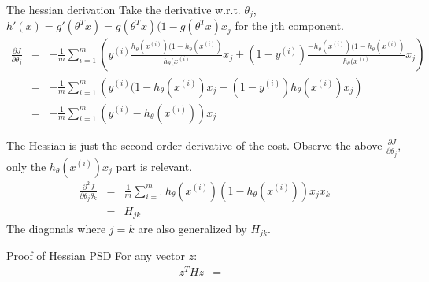 \begin{answer}

The hessian derivation
Take the derivative w.r.t. $\theta_j$,  $h'(x) = g'(\theta^T x) = g(\theta^T x)(1-g(\theta^T x) x_j$ for the jth component.
\begin{eqnarray*}
    \frac{\partial J}{\partial \theta_j}
	&=& -\frac{1}{m} \sum_{i=1}^m \left(y^{(i)} \frac{h_{\theta}(x^{(i)}) (1-h_{\theta}(x^{(i)})} {h_{\theta}(x^{(i)}} x_j
	+ (1 - y^{(i)}) \frac{-h_{\theta}(x^{(i)})  (1-h_{\theta}(x^{(i)}) } {h_{\theta}(x^{(i)}} x_j \right) \\
	&=& -\frac{1}{m} \sum_{i=1}^m \left(y^{(i)}  (1-h_{\theta}(x^{(i)}) x_j
	- (1 - y^{(i)}) h_{\theta}(x^{(i)}) x_j \right) \\
	&=& -\frac{1}{m} \sum_{i=1}^m (y^{(i)} - h_{\theta}(x^{(i)})) x_j
\end{eqnarray*}

The Hessian is just the second order derivative of the cost. Observe the above $\frac{\partial J}{\partial \theta_j}$, 
only the $ h_{\theta}(x^{(i)}) x_j$ part is relevant.
\begin{eqnarray*}
    \frac{\partial^2 J}{\partial \theta_j \theta_k}
	&=& \frac{1}{m} \sum_{i=1}^m  h_{\theta}(x^{(i)})(1 -  h_{\theta}(x^{(i)})) x_j x_k \\
	&=& H_{jk}
\end{eqnarray*}
The diagonals where $j = k$ are also generalized by $H_{jk}$.

Proof of Hessian PSD
For any vector $z$:
\begin{eqnarray*}
z^T H z 
	&=& 
\end{eqnarray*}

\end{answer}
